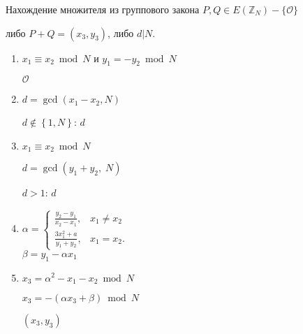 \documentclass{beamer}
\begin{document}
\begin{frame}{Нахождение множителя из группового закона}
     $P, Q \in E( \mathbb{Z}_N ) - \{\mathcal{O}\}$
    
     либо $P + Q = ( x_3,y_3 )$, либо $d|N$. 
    
    \begin{enumerate}
        \item {} $x_1 \equiv x_2\bmod N$ и $y_1 =  - y_2\bmod N$
        
        \quad {} $\mathcal{O}$
        
        \item $d = \gcd(x_1 - x_2, N)$

        \quad {} $d\not  \in \left\{1,N\right\}$:  $d$
        
        \item {} $x_1 \equiv x_2\bmod N$
        
        \quad $d = \gcd (y_1 + y_2,\;N)$
        
        \quad {} $d > 1$:  $d$
        
        \item 
        $
        \alpha =
        \begin{cases}
             \frac{y_2 - y_1}{x_2 - x_1},& x_1 \ne x_2 \\
            \frac{3x_1^2 + a}{y_1 + y_2},& x_1 = x_2.
        \end{cases}
        $\\
        $
        \beta  = y_1 - \alpha x_1
        $
        
        \item $x_3 = \alpha ^2 - x_1 - x_2\bmod N$
        
        $x_3 =  - ( \alpha x_3 + \beta  )\bmod N$
        
         $( x_3, y_3 )$
        
    \end{enumerate}
\end{frame}
\end{document}
